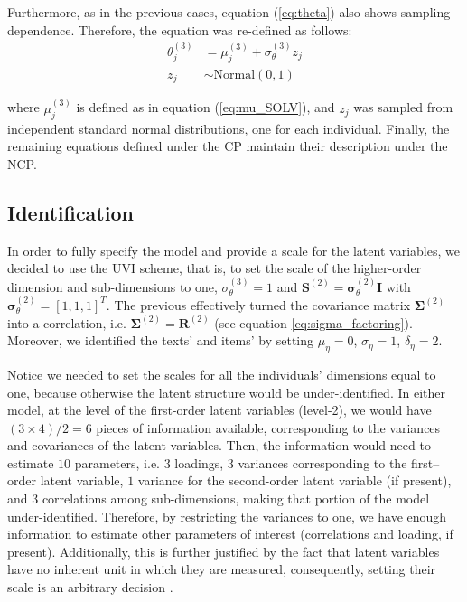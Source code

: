 Furthermore, as in the previous cases, equation (\ref{eq:theta}) also shows sampling dependence. Therefore, the equation was re-defined as follows:
%
\begin{align}
	\theta^{(3)}_{j} &= \mu^{(3)}_{j} + \sigma^{(3)}_{\theta} z_{j} \\
	z_{j} &\sim \text{Normal}(0,1)
\end{align}

\noindent where $\mu^{(3)}_{j}$ is defined as in equation (\ref{eq:mu_SOLV}), and $z_{j}$ was sampled from independent standard normal distributions, one for each individual. Finally, the remaining equations defined under the CP maintain their description under the NCP.


\subsection{Identification}

In order to fully specify the model and provide a scale for the latent variables, we decided to use the UVI scheme, that is, to set the scale of the higher-order dimension and sub-dimensions to one,  $\sigma^{(3)}_{\theta} = 1$ and $\mathbf{S}^{(2)} = \pmb{\sigma}^{(2)}_{\theta} \mathbf{I}$ with $\pmb{\sigma}^{(2)}_{\theta} = [1, 1, 1]^{T}$. The previous effectively turned the covariance matrix $\boldsymbol{\Sigma}^{(2)}$ into a correlation, i.e. $\boldsymbol{\Sigma}^{(2)} = \boldsymbol{R}^{(2)}$ (see equation \ref{eq:sigma_factoring}). Moreover, we identified the texts' and items' by setting $\mu_{\eta} = 0$, $\sigma_{\eta}=1$, $\delta_{\eta}=2$.

Notice we needed to set the scales for all the individuals' dimensions equal to one, because otherwise the latent structure would be under-identified. In either model, at the level of the first-order latent variables (level-2), we would have $(3 \times 4)/2 = 6$ pieces of information available, corresponding to the variances and covariances of the latent variables. Then, the information would need to estimate $10$ parameters, i.e. $3$ loadings, $3$ variances corresponding to the first--order latent variable, $1$ variance for the second-order latent variable (if present), and $3$ correlations among sub-dimensions, making that portion of the model under-identified. Therefore, by restricting the variances to one, we have enough information to estimate other parameters of interest (correlations and loading, if present). Additionally, this is further justified by the fact that latent variables have no inherent unit in which they are measured, consequently, setting their scale is an arbitrary  decision \cite{Beaujean_2014}.


